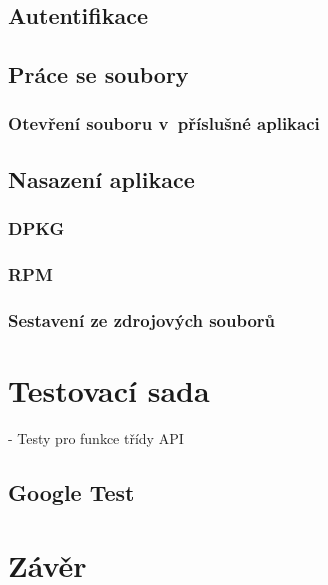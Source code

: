 \section{Autentifikace}
\section{Práce se soubory}
\subsection{Otevření souboru v příslušné aplikaci}

\cite{xdg}

\section{Nasazení aplikace}
\subsection{DPKG} %
\subsection{RPM} %
\subsection{Sestavení ze zdrojových souborů}

\chapter{Testovací sada}

- Testy pro funkce třídy API

\section{Google Test}

\chapter{Závěr}



